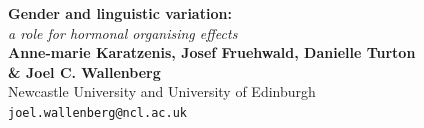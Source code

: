 \documentclass[a0,portrait]{a0poster}
\begin{document}


\begin{minipage}[b]{0.70\linewidth}
\veryHuge \color{NavyBlue} \textbf{Gender and linguistic variation:} \color{Black}\\ %
\Huge\textit{a role for hormonal organising effects}\\[2cm] %
\huge \textbf{Anne-marie Karatzenis, Josef Fruehwald, Danielle Turton \\\& Joel C. Wallenberg}\\[0.5cm] %
\huge Newcastle University and University of Edinburgh \\[0.4cm] %
\Large \texttt{joel.wallenberg@ncl.ac.uk}\\
\end{minipage}
%
\end{document}
